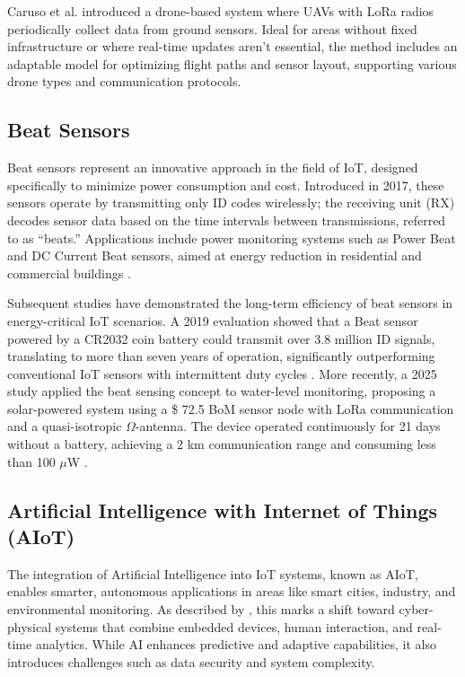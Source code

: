 \documentclass[conference]{IEEEtran}
\begin{document}
Caruso et al. \cite{caruso_2021_drone} introduced a drone-based system where UAVs with LoRa radios periodically collect data from ground sensors. Ideal for areas without fixed infrastructure or where real-time updates aren't essential, the method includes an adaptable model for optimizing flight paths and sensor layout, supporting various drone types and communication protocols.

\subsection{Beat Sensors}

Beat sensors represent an innovative approach in the field of IoT, designed specifically to minimize power consumption and cost. Introduced in 2017, these sensors operate by transmitting only ID codes wirelessly; the receiving unit (RX) decodes sensor data based on the time intervals between transmissions, referred to as “beats.” Applications include power monitoring systems such as Power Beat and DC Current Beat sensors, aimed at energy reduction in residential and commercial buildings \cite{ishibashi_2017_beat}.

Subsequent studies have demonstrated the long-term efficiency of beat sensors in energy-critical IoT scenarios. A 2019 evaluation showed that a Beat sensor powered by a CR2032 coin battery could transmit over 3.8 million ID signals, translating to more than seven years of operation, significantly outperforming conventional IoT sensors with intermittent duty cycles \cite{ishibashi_2019_long}. More recently, a 2025 study applied the beat sensing concept to water-level monitoring, proposing a solar-powered system using a \$ 72.5 BoM sensor node with LoRa communication and a quasi-isotropic $\Omega$-antenna. The device operated continuously for 21 days without a battery, achieving a 2 km communication range and consuming less than 100 $\mu$W \cite{dao_2025_lowcost}.

\subsection{Artificial Intelligence with Internet of Things (AIoT)}

The integration of Artificial Intelligence into IoT systems, known as AIoT, enables smarter, autonomous applications in areas like smart cities, industry, and environmental monitoring. As described by \cite{ghosh_2018_artificial}, this marks a shift toward cyber-physical systems that combine embedded devices, human interaction, and real-time analytics. While AI enhances predictive and adaptive capabilities, it also introduces challenges such as data security and system complexity.
\end{document}
